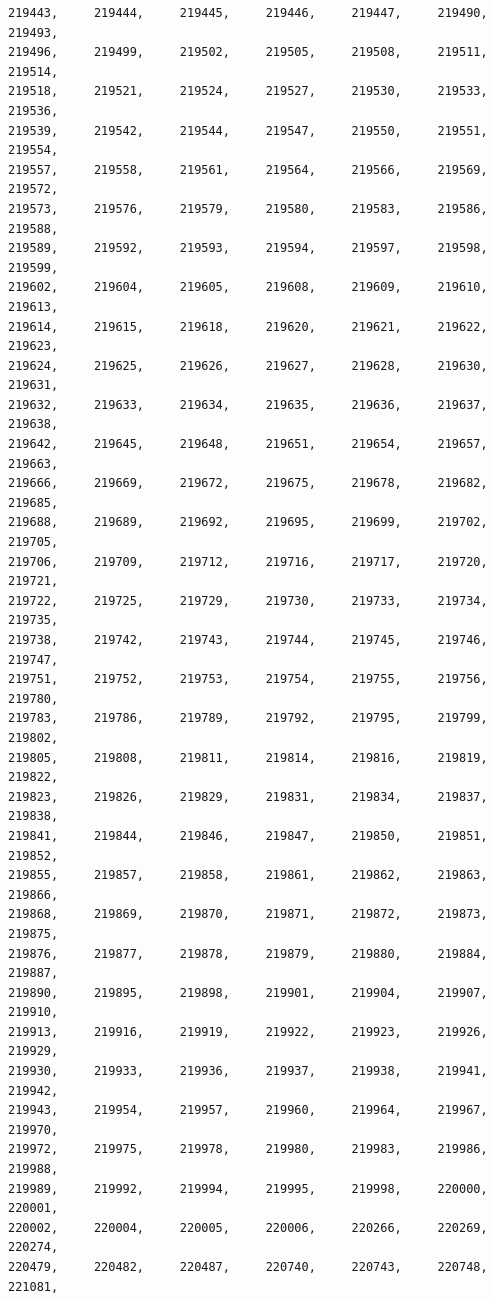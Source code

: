 \documentclass[a4paper,11pt]{report}
\begin{document}
\begin{verbatim}
219443,     219444,     219445,     219446,     219447,     219490,     219493,
219496,     219499,     219502,     219505,     219508,     219511,     219514,
219518,     219521,     219524,     219527,     219530,     219533,     219536,
219539,     219542,     219544,     219547,     219550,     219551,     219554,
219557,     219558,     219561,     219564,     219566,     219569,     219572,
219573,     219576,     219579,     219580,     219583,     219586,     219588,
219589,     219592,     219593,     219594,     219597,     219598,     219599,
219602,     219604,     219605,     219608,     219609,     219610,     219613,
219614,     219615,     219618,     219620,     219621,     219622,     219623,
219624,     219625,     219626,     219627,     219628,     219630,     219631,
219632,     219633,     219634,     219635,     219636,     219637,     219638,
219642,     219645,     219648,     219651,     219654,     219657,     219663,
219666,     219669,     219672,     219675,     219678,     219682,     219685,
219688,     219689,     219692,     219695,     219699,     219702,     219705,
219706,     219709,     219712,     219716,     219717,     219720,     219721,
219722,     219725,     219729,     219730,     219733,     219734,     219735,
219738,     219742,     219743,     219744,     219745,     219746,     219747,
219751,     219752,     219753,     219754,     219755,     219756,     219780,
219783,     219786,     219789,     219792,     219795,     219799,     219802,
219805,     219808,     219811,     219814,     219816,     219819,     219822,
219823,     219826,     219829,     219831,     219834,     219837,     219838,
219841,     219844,     219846,     219847,     219850,     219851,     219852,
219855,     219857,     219858,     219861,     219862,     219863,     219866,
219868,     219869,     219870,     219871,     219872,     219873,     219875,
219876,     219877,     219878,     219879,     219880,     219884,     219887,
219890,     219895,     219898,     219901,     219904,     219907,     219910,
219913,     219916,     219919,     219922,     219923,     219926,     219929,
219930,     219933,     219936,     219937,     219938,     219941,     219942,
219943,     219954,     219957,     219960,     219964,     219967,     219970,
219972,     219975,     219978,     219980,     219983,     219986,     219988,
219989,     219992,     219994,     219995,     219998,     220000,     220001,
220002,     220004,     220005,     220006,     220266,     220269,     220274,
220479,     220482,     220487,     220740,     220743,     220748,     221081,

\end{verbatim}
\end{document}
